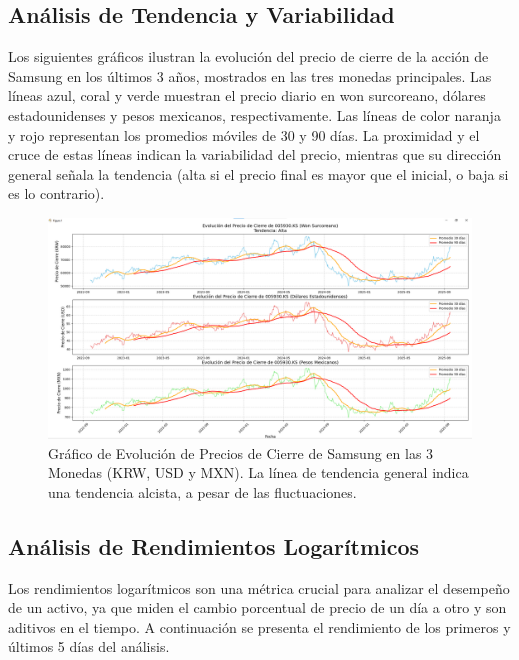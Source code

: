 \documentclass[12pt, a4paper]{article}
\begin{document}
\subsection*{Análisis de Tendencia y Variabilidad}
Los siguientes gráficos ilustran la evolución del precio de cierre de la acción de Samsung en los últimos 3 años, mostrados en las tres monedas principales. Las líneas azul, coral y verde muestran el precio diario en won surcoreano, dólares estadounidenses y pesos mexicanos, respectivamente. Las líneas de color naranja y rojo representan los promedios móviles de 30 y 90 días. La proximidad y el cruce de estas líneas indican la variabilidad del precio, mientras que su dirección general señala la tendencia (alta si el precio final es mayor que el inicial, o baja si es lo contrario).

\begin{figure}[H]
    \centering
    \includegraphics[width=\textwidth]{grafica_precio_evolucion.png}
    \caption{Gráfico de Evolución de Precios de Cierre de Samsung en las 3 Monedas (KRW, USD y MXN). La línea de tendencia general indica una tendencia alcista, a pesar de las fluctuaciones.}
    \label{fig:precio_evolucion}
\end{figure}

\newpage
\subsection*{Análisis de Rendimientos Logarítmicos}
Los rendimientos logarítmicos son una métrica crucial para analizar el desempeño de un activo, ya que miden el cambio porcentual de precio de un día a otro y son aditivos en el tiempo. A continuación se presenta el rendimiento de los primeros y últimos 5 días del análisis.
\end{document}
